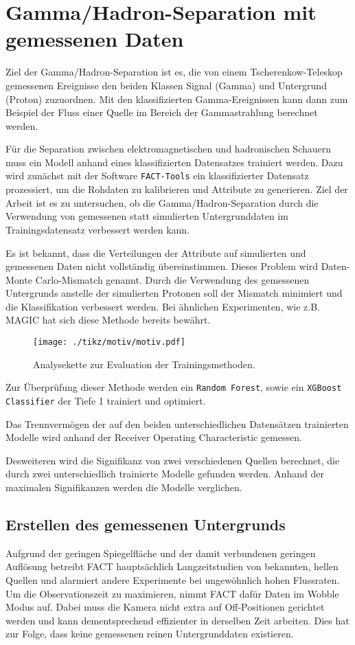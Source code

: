 \chapter{Gamma/Hadron-Separation mit gemessenen Daten}
Ziel der Gamma/Hadron-Separation ist es, die von einem Tscherenkow-Teleskop gemessenen Ereignisse den beiden Klassen Signal (Gamma) und Untergrund (Proton) zuzuordnen.
Mit den klassifizierten Gamma-Ereignissen kann dann zum Beispiel der Fluss einer Quelle im Bereich der Gammastrahlung berechnet werden.

Für die Separation zwischen elektromagnetischen und hadronischen Schauern muss ein Modell anhand eines klassifizierten Datensatzes trainiert werden.
Dazu wird zunächst mit der Software \texttt{FACT-Tools} \cite{Bockermann} ein klassifizierter Datensatz prozessiert, um die Rohdaten zu kalibrieren und Attribute zu generieren.
Ziel der Arbeit ist es zu untersuchen, ob die Gamma/Hadron-Separation durch die Verwendung von gemessenen statt simulierten Untergrunddaten im Trainingsdatensatz verbessert werden kann.

Es ist bekannt, dass die Verteilungen der Attribute auf simulierten und gemessenen Daten nicht vollständig übereinstimmen.
Dieses Problem wird Daten-Monte Carlo-Mismatch genannt.
Durch die Verwendung des gemessenen Untergrunds anstelle der simulierten Protonen soll der Mismatch minimiert und die Klassifikation verbessert werden.
Bei ähnlichen Experimenten, wie z.B. MAGIC \cite{magic} hat sich diese Methode bereits bewährt. 
\begin{figure}[H]
  \centering
  \texttt{[image: ./tikz/motiv/motiv.pdf]}
  \caption{Analysekette zur Evaluation der Trainingsmethoden.}
\end{figure}
Zur Überprüfung dieser Methode werden ein \texttt{Random Forest}, sowie ein \texttt{XGBoost Classifier} der Tiefe 1 trainiert und optimiert.

Das Trennvermögen der auf den beiden unterschiedlichen Datensätzen trainierten Modelle wird anhand der Receiver Operating Characteristic gemessen.

Desweiteren wird die Signifikanz von zwei verschiedenen Quellen berechnet, die durch zwei unterschiedlich trainierte Modelle gefunden werden. 
Anhand der maximalen Signifikanzen werden die Modelle verglichen.
\section{Erstellen des gemessenen Untergrunds}
\label{sec:makeUnter}
Aufgrund der geringen Spiegelfläche und der damit verbundenen geringen Auflösung betreibt FACT hauptsächlich Langzeitstudien von bekannten, hellen Quellen und alarmiert andere Experimente bei ungewöhnlich hohen Flussraten.
Um die Observationszeit zu maximieren, nimmt FACT dafür Daten im Wobble Modus auf. 
Dabei muss die Kamera nicht extra auf Off-Positionen gerichtet werden und kann dementsprechend effizienter in derselben Zeit arbeiten. 
Dies hat zur Folge, dass keine gemessenen reinen Untergrunddaten existieren. 

